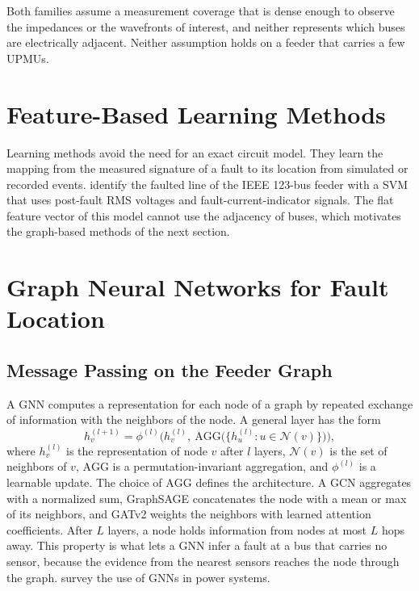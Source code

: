 \documentclass[MTech]{ugthesis}
\begin{document}
Both families assume a measurement coverage that is dense enough to observe the impedances or the wavefronts of interest, and neither represents which buses are electrically adjacent. Neither assumption holds on a feeder that carries a few \acp{UPMU}.

\section{Feature-Based Learning Methods}

Learning methods avoid the need for an exact circuit model. They learn the mapping from the measured signature of a fault to its location from simulated or recorded events. \citet{livani2013} identify the faulted line of the IEEE 123-bus feeder with a \ac{SVM} that uses post-fault \ac{RMS} voltages and fault-current-indicator signals. The flat feature vector of this model cannot use the adjacency of buses, which motivates the graph-based methods of the next section.

\section{Graph Neural Networks for Fault Location}

\subsection{Message Passing on the Feeder Graph}

A \ac{GNN} computes a representation for each node of a graph by repeated exchange of information with the neighbors of the node. A general layer has the form
\begin{equation}
h_v^{(l+1)}=\phi^{(l)}\Big(h_v^{(l)},\ \mathrm{AGG}\big(\{h_u^{(l)}:u\in\mathcal{N}(v)\}\big)\Big),
\label{eq:mp}
\end{equation}
where $h_v^{(l)}$ is the representation of node $v$ after $l$ layers, $\mathcal{N}(v)$ is the set of neighbors of $v$, $\mathrm{AGG}$ is a permutation-invariant aggregation, and $\phi^{(l)}$ is a learnable update. The choice of $\mathrm{AGG}$ defines the architecture. A \ac{GCN} \citep{kipf2016} aggregates with a normalized sum, GraphSAGE \citep{hamilton2017} concatenates the node with a mean or max of its neighbors, and GATv2 \citep{brody2022} weights the neighbors with learned attention coefficients. After $L$ layers, a node holds information from nodes at most $L$ hops away. This property is what lets a \ac{GNN} infer a fault at a bus that carries no sensor, because the evidence from the nearest sensors reaches the node through the graph. \citet{liao2021} survey the use of \acp{GNN} in power systems.
\end{document}
